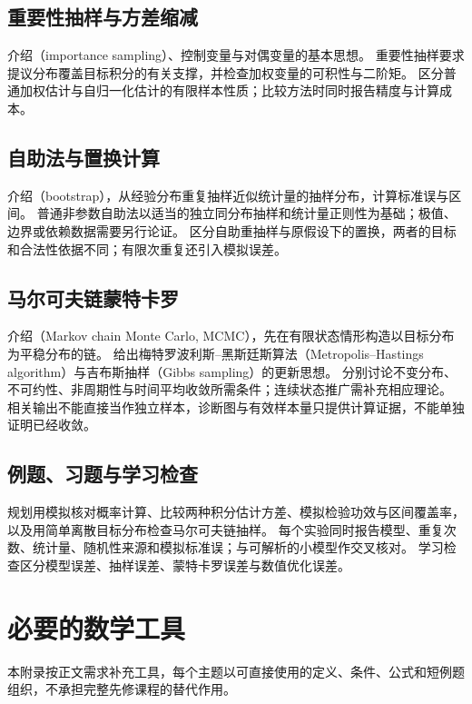 \documentclass[UTF8,12pt,a4paper,fontset=fandol]{ctexbook}
\begin{document}
\section{重要性抽样与方差缩减}
\label{sec:ps-variance-reduction}
介绍（importance sampling）、控制变量与对偶变量的基本思想。
重要性抽样要求提议分布覆盖目标积分的有关支撑，并检查加权变量的可积性与二阶矩。
区分普通加权估计与自归一化估计的有限样本性质；比较方法时同时报告精度与计算成本。

\section{自助法与置换计算}
\label{sec:ps-bootstrap}
介绍（bootstrap），从经验分布重复抽样近似统计量的抽样分布，计算标准误与区间。
普通非参数自助法以适当的独立同分布抽样和统计量正则性为基础；极值、边界或依赖数据需要另行论证。
区分自助重抽样与原假设下的置换，两者的目标和合法性依据不同；有限次重复还引入模拟误差。

\section{马尔可夫链蒙特卡罗}
\label{sec:ps-mcmc}
介绍（Markov chain Monte Carlo, MCMC），先在有限状态情形构造以目标分布为平稳分布的链。
给出梅特罗波利斯--黑斯廷斯算法（Metropolis--Hastings algorithm）与吉布斯抽样（Gibbs sampling）的更新思想。
分别讨论不变分布、不可约性、非周期性与时间平均收敛所需条件；连续状态推广需补充相应理论。
相关输出不能直接当作独立样本，诊断图与有效样本量只提供计算证据，不能单独证明已经收敛。

\section{例题、习题与学习检查}
规划用模拟核对概率计算、比较两种积分估计方差、模拟检验功效与区间覆盖率，以及用简单离散目标分布检查马尔可夫链抽样。
每个实验同时报告模型、重复次数、统计量、随机性来源和模拟标准误；与可解析的小模型作交叉核对。
学习检查区分模型误差、抽样误差、蒙特卡罗误差与数值优化误差。


\appendix

\chapter{必要的数学工具}
\label{app:ps-prerequisites}

本附录按正文需求补充工具，每个主题以可直接使用的定义、条件、公式和短例题组织，不承担完整先修课程的替代作用。
\end{document}
